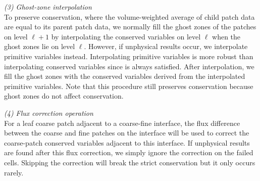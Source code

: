 \emph{(3) Ghost-zone interpolation}\\
To preserve conservation, where the volume-weighted average of child patch data are equal to its parent patch data, we normally fill the ghost zones of the patches on level $\ell+1$ by interpolating the conserved variables on level $\ell$ when the ghost zones lie on level $\ell$. However, if unphysical results occur, we interpolate primitive variables instead. Interpolating primitive variables is more robust than interpolating conserved variables since  is always satisfied. After interpolation, we fill the ghost zones with the conserved variables derived from the interpolated primitive variables. Note that this procedure still preserves conservation because ghost zones do not affect conservation.

\emph{(4) Flux correction operation}\\
For a leaf coarse patch adjacent to a coarse-fine interface, the flux difference between the coarse and fine patches on the interface will be used to correct the coarse-patch conserved variables adjacent to this interface. If unphysical results are found after this flux correction, we simply ignore the correction on the failed cells. Skipping the correction will break the strict conservation but it only occurs rarely.
